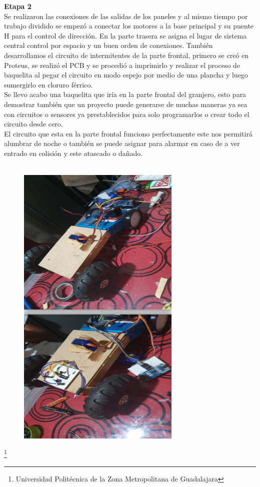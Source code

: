 \documentclass[11pt,a4paper]{article}
\begin{document}
\textbf{Etapa 2}\\
Se realizaron las conexiones de las salidas de los paneles y al mismo tiempo por trabajo dividido se empezó a conectar los motores a la base principal y su puente H para el control de dirección. En la parte trasera se asigna el lugar de sistema central control por espacio y un buen orden de conexiones.
También desarrollamos el circuito de intermitentes de la parte frontal, primero se creó en Proteus, se realizó el PCB y se procedió a imprimirlo y realizar el proceso de baquelita al pegar el circuito en modo espejo por medio de una plancha y luego sumergirlo en cloruro férrico.\\
Se llevo acabo una baquelita que iría en la parte frontal del granjero, esto para demostrar también que un proyecto puede generarse de muchas maneras ya sea con circuitos o sensores ya prestablecidos para solo programarlos o crear todo el circuito desde cero.\\
El circuito que esta en la parte frontal funciono perfectamente este nos permitirá alumbrar de noche o también se puede asignar para alarmar en caso de a ver entrado en colisión y este atascado o dañado.\\\\
\begin{figure}[hbtp]
\centering
\includegraphics[scale=0.60]{Pictures/03.png}
\end{figure} 
\footnote{Universidad Politécnica de la Zona Metropolitana de Guadalajara}
\end{document}
